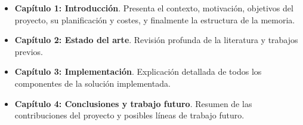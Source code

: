\begin{itemize}
    \item \textbf{Capítulo 1: Introducción}. Presenta el contexto, motivación, objetivos del proyecto, su planificación y costes, y finalmente la estructura de la memoria.
    
    \item \textbf{Capítulo 2: Estado del arte}. Revisión profunda de la literatura y trabajos previos.

    
    
    \item \textbf{Capítulo 3: Implementación}. Explicación detallada de todos los componentes de la solución implementada.
    
    
    \item \textbf{Capítulo 4: Conclusiones y trabajo futuro}. Resumen de las contribuciones del proyecto y posibles líneas de trabajo futuro.
\end{itemize}
